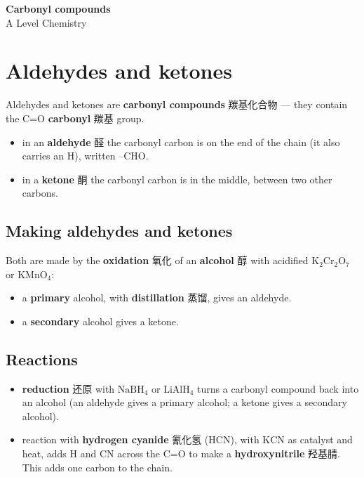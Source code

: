 \documentclass[11pt]{article}
\begin{document}
\begin{center}
  {\LARGE\bfseries Carbonyl compounds}\\[0.35em]
  {\large A Level Chemistry}
\end{center}
\vspace{0.6em}

\section*{Aldehydes and ketones}

Aldehydes and ketones are \textbf{carbonyl compounds} 羰基化合物 — they contain the C=O \textbf{carbonyl} 羰基 group.

\begin{itemize}
\item in an \textbf{aldehyde} 醛 the carbonyl carbon is on the end of the chain (it also carries an H), written $\text{–CHO}$.

\item in a \textbf{ketone} 酮 the carbonyl carbon is in the middle, between two other carbons.

\end{itemize}

\subsection*{Making aldehydes and ketones}

Both are made by the \textbf{oxidation} 氧化 of an \textbf{alcohol} 醇 with acidified $\text{K}_2\text{Cr}_2\text{O}_7$ or $\text{KMnO}_4$:

\begin{itemize}
\item a \textbf{primary} alcohol, with \textbf{distillation} 蒸馏, gives an aldehyde.

\item a \textbf{secondary} alcohol gives a ketone.

\end{itemize}

\subsection*{Reactions}

\begin{itemize}
\item \textbf{reduction} 还原 with $\text{NaBH}_4$ or $\text{LiAlH}_4$ turns a carbonyl compound back into an alcohol (an aldehyde gives a primary alcohol; a ketone gives a secondary alcohol).

\item reaction with \textbf{hydrogen cyanide} 氰化氢 ($\text{HCN}$), with $\text{KCN}$ as catalyst and heat, adds $\text{H}$ and $\text{CN}$ across the C=O to make a \textbf{hydroxynitrile} 羟基腈. This adds one carbon to the chain.

\end{itemize}
\end{document}
